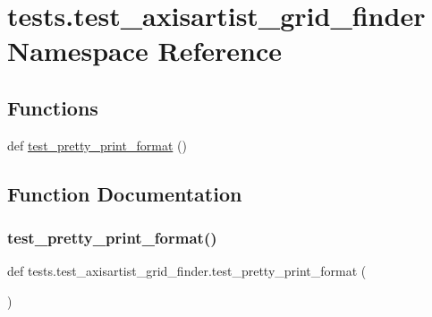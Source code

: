 \hypertarget{namespacetests_1_1test__axisartist__grid__finder}{}\section{tests.\+test\+\_\+axisartist\+\_\+grid\+\_\+finder Namespace Reference}
\label{namespacetests_1_1test__axisartist__grid__finder}
\subsection*{Functions}
\begin{DoxyCompactItemize}
\item 
def \hyperlink{namespacetests_1_1test__axisartist__grid__finder_a4dd7a9c85fc8580936daaad14f867588}{test\+\_\+pretty\+\_\+print\+\_\+format} ()
\end{DoxyCompactItemize}


\subsection{Function Documentation}
\mbox{\label{namespacetests_1_1test__axisartist__grid__finder_a4dd7a9c85fc8580936daaad14f867588}} 
\subsubsection{\texorpdfstring{test\+\_\+pretty\+\_\+print\+\_\+format()}{test\_pretty\_print\_format()}}
{\footnotesize\ttfamily def tests.\+test\+\_\+axisartist\+\_\+grid\+\_\+finder.\+test\+\_\+pretty\+\_\+print\+\_\+format (\begin{DoxyParamCaption}{ }\end{DoxyParamCaption})}

